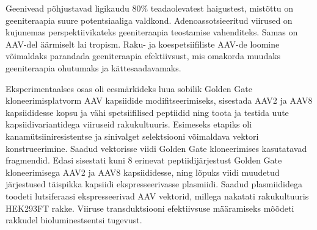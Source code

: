 \documentclass{trkut}%
\begin{document}
Geenivead põhjustavad ligikaudu 80\% teadaolevatest haigustest, mistõttu on geeniteraapia suure potentsiaaliga valdkond. Adenoassotsieeritud viirused on kujunemas perspektiivikateks geeniteraapia teostamise vahenditeks. Samas on AAV-del äärmiselt lai tropism. Raku- ja koespetsiifiliste AAV-de loomine võimaldaks parandada geeniteraapia efektiivsust, mis omakorda muudaks geeniteraapia ohutumaks ja kättesaadavamaks.


Eksperimentaalses osas oli eesmärkideks luua sobilik Golden Gate kloneerimisplatvorm AAV kapsiidide modifitseerimiseks, sisestada AAV2 ja AAV8 kapsiididesse kopsu ja vähi spetsiifilised peptiidid ning toota ja testida uute kapsiidivariantidega viiruseid rakukultuuris. Esimeseks etapiks oli kanamütsiiniresistentse ja sinivalget selektsiooni võimaldava vektori konstrueerimine. Saadud vektorisse viidi Golden Gate kloneerimises kasutatavad fragmendid. Edasi sisestati kuni 8 erinevat peptiidijärjestust Golden Gate kloneerimisega AAV2 ja AAV8 kapsiididesse, ning lõpuks viidi muudetud järjestused täispikka kapsiidi ekspresseerivasse plasmiidi. Saadud plasmiididega toodeti lutsiferaasi ekspresseerivad AAV vektorid, millega nakatati rakukultuuris HEK293FT rakke. Viiruse transduktsiooni efektiivsuse määramiseks mõõdeti rakkudel bioluminestsentsi tugevust.

\end{document}
